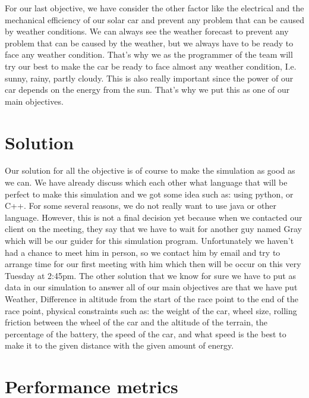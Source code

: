 \documentclass[journal, 10pt, draftclsnofoot, onecolumn]{IEEEtran}
\begin{document}
	For our last objective, we have consider the other factor like the electrical and the mechanical efficiency of our solar car and prevent any problem that can be caused by weather conditions. We can always see the weather forecast to prevent any problem that can be caused by the weather, but we always have to be ready to face any weather condition. That’s why we as the programmer of the team will try our best to make the car be ready to face almost any weather condition, I.e. sunny, rainy, partly cloudy. This is also really important since the power of our car depends on the energy from the sun. That’s why we put this as one of our main objectives. 
	
\section{Solution}

	Our solution for all the objective is of course to make the simulation as good as we can. We have already discuss which each other what language that will be perfect to make this simulation and we got some idea such as: using python, or C++. For some several reasons, we do not really want to use java or other language. However, this is not a final decision yet because when we contacted our client on the meeting, they say that we have to wait for another guy named Gray which will be our guider for this simulation program. Unfortunately we haven’t had a chance to meet him in person, so we contact him by email and try to arrange time for our first meeting with him which then will be occur on this very Tuesday at 2:45pm. The other solution that we know for sure we have to put as data in our simulation to answer all of our main objectives are that we have put Weather, Difference in altitude from the start of the race point to the end of the race point, physical constraints such as: the weight of the car, wheel size, rolling friction between the wheel of the car and the altitude of the terrain, the percentage of the battery, the speed of the car, and what speed is the best to make it to the given distance with the given amount of energy. 
	
\section{Performance metrics}
\end{document}
